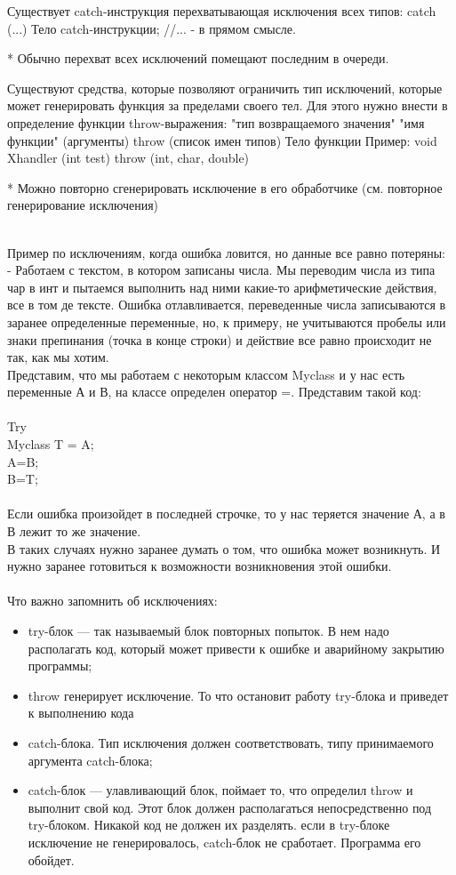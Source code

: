 \documentclass[a4paper,10pt]{article}
\begin{document}
Существует catch-инструкция перехватывающая исключения всех типов:
catch (...) {Тело catch-инструкции}; //... - в прямом смысле.

* Обычно перехват всех исключений помещают последним в очереди.

Существуют средства, которые позволяют ограничить тип исключений, которые может генерировать функция за пределами своего тел. Для этого нужно внести в определение функции throw-выражения:
"тип возвращаемого значения" "имя функции" (аргументы) throw (список имен типов) {Тело функции}
Пример:
void Xhandler (int test) throw (int, char, double)

* Можно повторно сгенерировать исключение в его обработчике (см. повторное генерирование исключения)

\\Пример по исключениям, когда ошибка ловится, но данные все равно потеряны:
\\- Работаем с текстом, в котором записаны числа. Мы переводим числа из типа чар в инт и пытаемся выполнить над ними какие-то арифметические действия, все в том де тексте. 
Ошибка отлавливается, переведенные числа записываются в заранее определенные переменные, но, к примеру, не учитываются пробелы или знаки препинания (точка в конце строки) и действие все равно происходит не так, как мы хотим.
\\
Представим, что мы работаем с некоторым классом Myclass и у нас есть переменные А и В, на классе определен оператор =. Представим такой код:
\\
\\Try {
\\Myclass T = A;
\\A=B;
\\B=T;
\\}
\\
Если ошибка произойдет в последней строчке, то у нас теряется значение А, а в В лежит то же значение.
\\В таких случаях нужно заранее думать о том, что ошибка может возникнуть. И нужно заранее готовиться к возможности возникновения этой ошибки.
\\
\\Что важно запомнить об исключениях:
\begin{itemize}
\item try-блок — так называемый блок повторных попыток. В нем надо располагать код, который может привести к ошибке и аварийному закрытию программы;
\item throw генерирует исключение. То что остановит работу try-блока и приведет к выполнению кода \item catch-блока. Тип исключения должен соответствовать, типу принимаемого аргумента catch-блока;
\item catch-блок — улавливающий блок, поймает то, что определил  throw и выполнит свой код. Этот блок должен располагаться непосредственно под try-блоком. Никакой код не должен их разделять.
если в try-блоке исключение не генерировалось, catch-блок не сработает. Программа его обойдет.
\end{itemize}
\end{document}
